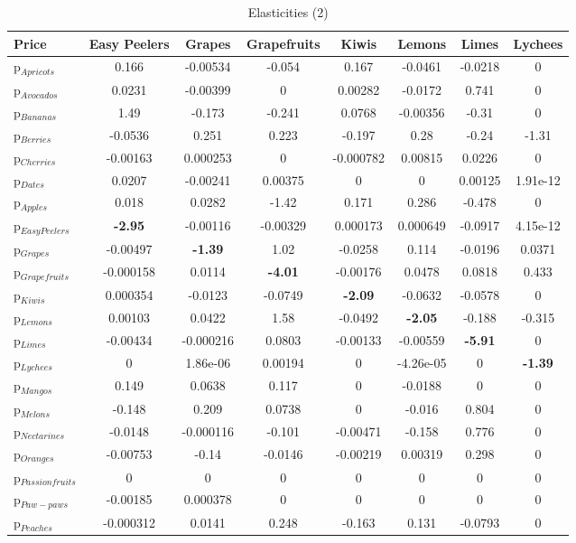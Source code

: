 \documentclass[11pt]{article}
\begin{document}
\begin{table}[h]
\caption{Elasticities (2)}
\label{table:elasticities 2}
\begin{center}
\begin{tabular}{lccccccc} \hline \hline
Price &Easy Peelers &Grapes &Grapefruits &Kiwis &Lemons &Limes &Lychees \\ \hline
p$_{Apricots}$ &0.166 &-0.00534 &-0.054 &0.167 &-0.0461 &-0.0218 &0 \\
p$_{Avocados}$ &0.0231 &-0.00399 &0 &0.00282 &-0.0172 &0.741 &0 \\
p$_{Bananas}$ &1.49 &-0.173 &-0.241 &0.0768 &-0.00356 &-0.31 &0 \\
p$_{Berries}$ &-0.0536 &0.251 &0.223 &-0.197 &0.28 &-0.24 &-1.31 \\
p$_{Cherries}$ &-0.00163 &0.000253 &0 &-0.000782 &0.00815 &0.0226 &0 \\
p$_{Dates}$ &0.0207 &-0.00241 &0.00375 &0 &0 &0.00125 &1.91e-12 \\
p$_{Apples}$ &0.018 &0.0282 &-1.42 &0.171 &0.286 &-0.478 &0 \\
p$_{Easy Peelers}$ &\textbf{-2.95} &-0.00116 &-0.00329 &0.000173 &0.000649 &-0.0917 &4.15e-12 \\
p$_{Grapes}$ &-0.00497 &\textbf{-1.39} &1.02 &-0.0258 &0.114 &-0.0196 &0.0371 \\
p$_{Grapefruits}$ &-0.000158 &0.0114 &\textbf{-4.01} &-0.00176 &0.0478 &0.0818 &0.433 \\
p$_{Kiwis}$ &0.000354 &-0.0123 &-0.0749 &\textbf{-2.09} &-0.0632 &-0.0578 &0 \\
p$_{Lemons}$ &0.00103 &0.0422 &1.58 &-0.0492 &\textbf{-2.05} &-0.188 &-0.315 \\
p$_{Limes}$ &-0.00434 &-0.000216 &0.0803 &-0.00133 &-0.00559 &\textbf{-5.91} &0 \\
p$_{Lychees}$ &0 &1.86e-06 &0.00194 &0 &-4.26e-05 &0 &\textbf{-1.39} \\
p$_{Mangos}$ &0.149 &0.0638 &0.117 &0 &-0.0188 &0 &0 \\
p$_{Melons}$ &-0.148 &0.209 &0.0738 &0 &-0.016 &0.804 &0 \\
p$_{Nectarines}$ &-0.0148 &-0.000116 &-0.101 &-0.00471 &-0.158 &0.776 &0 \\
p$_{Oranges}$ &-0.00753 &-0.14 &-0.0146 &-0.00219 &0.00319 &0.298 &0 \\
p$_{Passion fruits}$ &0 &0 &0 &0 &0 &0 &0 \\
p$_{Paw-paws}$ &-0.00185 &0.000378 &0 &0 &0 &0 &0 \\
p$_{Peaches}$ &-0.000312 &0.0141 &0.248 &-0.163 &0.131 &-0.0793 &0 \\

\end{tabular}
\end{center}
\end{table}
\end{document}
